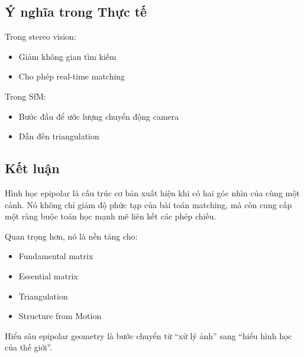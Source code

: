 \subsection{Ý nghĩa trong Thực tế}
\label{subsec:epipolar_practice}

Trong stereo vision:
\begin{itemize}
	\item Giảm không gian tìm kiếm
	\item Cho phép real-time matching
\end{itemize}

Trong SfM:
\begin{itemize}
	\item Bước đầu để ước lượng chuyển động camera
	\item Dẫn đến triangulation
\end{itemize}

\subsection*{Kết luận}
\label{subsec:epipolar_conclusion}

Hình học epipolar là cấu trúc cơ bản xuất hiện khi có hai góc nhìn của cùng một cảnh. Nó không chỉ giảm độ phức tạp của bài toán matching, mà còn cung cấp một ràng buộc toán học mạnh mẽ liên kết các phép chiếu.

Quan trọng hơn, nó là nền tảng cho:
\begin{itemize}
	\item Fundamental matrix
	\item Essential matrix
	\item Triangulation
	\item Structure from Motion
\end{itemize}

Hiểu sâu epipolar geometry là bước chuyển từ “xử lý ảnh” sang “hiểu hình học của thế giới”.